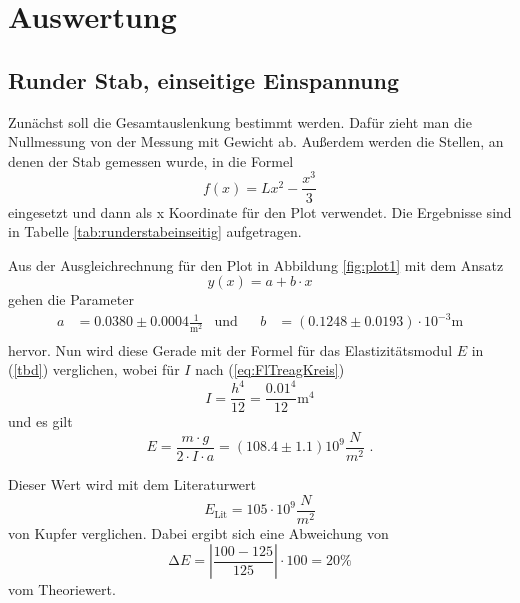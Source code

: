 \section{Auswertung}
\label{sec:Auswertung}

\subsection{Runder Stab, einseitige Einspannung}
Zunächst soll die Gesamtauslenkung bestimmt werden.
Dafür zieht man die Nullmessung von der Messung mit Gewicht ab.
Außerdem werden die Stellen, an denen der Stab gemessen wurde, in die Formel 
\begin{equation}
  f(x) = Lx^2 - \frac{x^3}{3}
\end{equation}
eingesetzt und dann als x Koordinate für den Plot verwendet.
Die Ergebnisse sind in Tabelle \ref{tab:runderstabeinseitig} aufgetragen.

Aus der Ausgleichrechnung für den Plot in Abbildung \ref{fig:plot1} mit dem Ansatz
\begin{equation*}
  y(x) = a + b \cdot x
\end{equation*}
gehen die Parameter
\begin{align*}
  a &= 0.0380 ± 0.0004 \frac{1}{\unit{\meter\squared}} & \text{und}& & b&= (0.1248 ± 0.0193) \cdot 10^{-3} \unit\meter\\
\end{align*}
hervor. Nun wird diese Gerade mit der Formel für das Elastizitätsmodul $E$ in (\ref{tbd}) verglichen, wobei für $I$ nach (\ref{eq:FlTreagKreis})
\begin{equation*}
  I = \frac{h^4} {12} = \frac{0.01^4} {12} \unit\meter^4
\end{equation*}
und es gilt
\begin{equation*}
  E = \frac{m \cdot g} {2 \cdot I \cdot a} = (108.4 \pm 1.1) 10^9 \frac{N}{m^2} \text{ .}
\end{equation*}

Dieser Wert wird mit dem Literaturwert {\cite{demtroeder1}}
\begin{equation*}
  E_\text{Lit} = 105 \cdot 10^9 \frac{N}{m^2}
\end{equation*}
von Kupfer verglichen. Dabei ergibt sich eine Abweichung von
\begin{equation*}
  \increment E = \left|\frac{100 - 125}{125}\right| \cdot 100 = 20 \%
\end{equation*}
vom Theoriewert.

